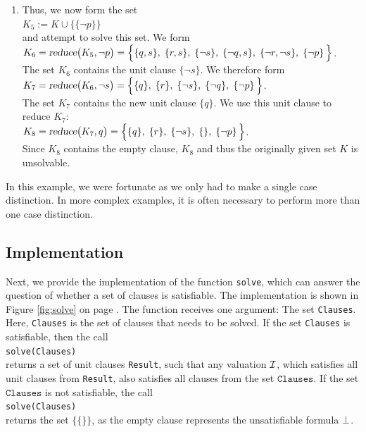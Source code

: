 \begin{enumerate}
\item Thus, we now form the set
      \\[0.2cm]
      \hspace*{1.3cm} $K_5 := K \cup \bigl\{ \{\neg p\} \bigr\}$ \\[0.2cm]
      and attempt to solve this set. We form
      \\[0.2cm]
      \hspace*{1.3cm} 
      $K_6 = \textsl{reduce}\bigl(K_5, \neg p\bigr) =
      \Big\{ \{q, s\},\; \{r, s\},\;\{\neg s\},\; \{\neg q, s\},\; \{\neg r, \neg s\},\;\{\neg p\}\, \Big\}$.
      \\[0.2cm]
      The set $K_6$ contains the unit clause $\{\neg s\}$.
      We therefore form \\[0.2cm]
      \hspace*{1.3cm} 
      $K_7 = \textsl{reduce}\bigl(K_6, \neg s\bigr) =\Big\{ \{q\},\; \{r\},\;\{\neg s\},\; \{\neg q\},\;\{\neg p\}\, \Big\}$.
      \\[0.2cm]
      The set $K_7$ contains the new unit clause $\{q\}$.  We use this unit clause to reduce $K_7$:
      \\[0.2cm]
      \hspace*{1.3cm} 
      $K_8 = \textsl{reduce}\bigl(K_7, q \bigr) =\Big\{ \{q\},\; \{r\},\;\{\neg s\},\; \{\},\;\{\neg p\}\, \Big\}$.
      \\[0.2cm]
      Since $K_8$ contains the empty clause, $K_8$ and thus the originally
      given set $K$ is unsolvable.
\end{enumerate}
In this example, we were fortunate as we only had to make a single case distinction.
In more complex examples, it is often necessary to perform more than one case distinction.

\subsection{Implementation}
Next, we provide the implementation of the function \texttt{solve}, 
which can answer the question of whether a set of clauses is satisfiable. The
implementation is shown in Figure \ref{fig:solve} on page \pageref{fig:solve}.
The function receives one argument: The set \texttt{Clauses}.
Here, \texttt{Clauses} is the set of clauses that needs to be solved. If the set \texttt{Clauses} is
satisfiable, then the call 
\\[0.2cm]
\hspace*{1.3cm}
\texttt{solve(Clauses)} 
\\[0.2cm]
returns a set of unit clauses \texttt{Result}, such
that any valuation $\mathcal{I}$, which satisfies all unit clauses from \texttt{Result}, also satisfies all clauses from
the set $\texttt{Clauses}$. If the set $\texttt{Clauses}$ is not satisfiable, the call
\\[0.2cm]
\hspace*{1.3cm}
\texttt{solve(Clauses)}
\\[0.2cm]
returns the set $\bigl\{ \{\} \bigr\}$, as the empty clause represents the unsatisfiable formula $\bot$.
 
